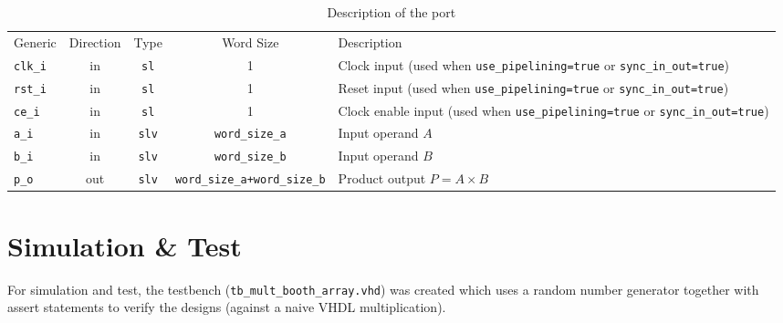 \documentclass[a4paper,BCOR7mm,12pt,pointlessnumbers,bibtotoc]{scrartcl}
\begin{document}
\begin{table}[!h]
	\renewcommand{\arraystretch}{1.1}
	\caption{Description of the port}
	\label{tab:port}
	\centering
	\begin{tabular}{lcccL{5cm}}
	  \toprule
	  Generic & Direction & Type & Word Size & Description\\
    \cmidrule(rl){1-1} \cmidrule(rl){2-2} \cmidrule(rl){3-3} \cmidrule(rl){4-4} \cmidrule(rl){5-5}
    \verb|clk_i| & in  & \verb|sl|    & 1                              & Clock input (used when \verb|use_pipelining=true| or \verb|sync_in_out=true|)\\
    \verb|rst_i| & in  & \verb|sl|    & 1                              & Reset input (used when \verb|use_pipelining=true| or \verb|sync_in_out=true|)\\
    \verb|ce_i|  & in  & \verb|sl|    & 1                              & Clock enable input (used when \verb|use_pipelining=true| or \verb|sync_in_out=true|)\\
    \verb|a_i|   & in  & \verb|slv|   & \verb|word_size_a|             & Input operand $A$\\
    \verb|b_i|   & in  & \verb|slv|   & \verb|word_size_b|             & Input operand $B$\\
    \verb|p_o|   & out & \verb|slv|   & \verb|word_size_a+word_size_b| & Product output $P=A \times B$\\
    \bottomrule
   \end{tabular}
\end{table}


\section{Simulation \& Test}

For simulation and test, the testbench (\verb|tb_mult_booth_array.vhd|) was created which uses a random number generator together with assert statements to verify the designs (against a naive VHDL multiplication). 



\end{document}
